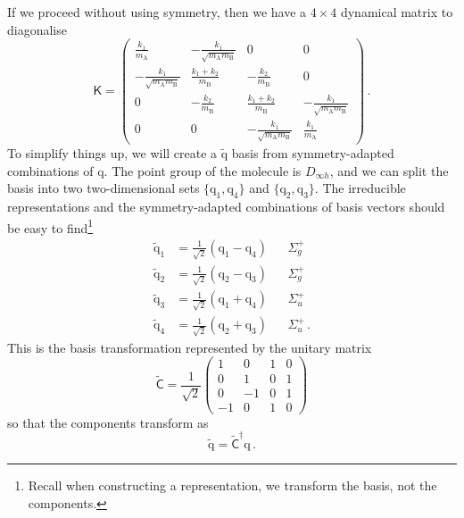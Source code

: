 \documentclass{article}
\theoremstyle{plain}\theoremheaderfont{\normalfont\itshape}\theorembodyfont{\rmfamily}\theoremseparator{.}\newtheorem*{rem}{Remark}\newtheorem*{ex}{Example}\newtheorem*{proof}{Proof}\newtheorem*{altp}{Alternative proof}
\theoremstyle{plain}\theoremheaderfont{\normalfont\bfseries}\theorembodyfont{\rmfamily}\theoremseparator{.}\newtheorem{thm}{Theorem}[section]\newtheorem{lem}[thm]{Lemma}\newtheorem{prop}[thm]{Proposition}\newtheorem*{cor}{Corollary}\newtheorem{defn}[thm]{Definition}\newtheorem{clm}[thm]{Claim}\newtheorem{clminproof}{Claim}
\theoremstyle{break}\theoremheaderfont{\normalfont\itshape}\theorembodyfont{\rmfamily}\theoremseparator{.\medskip}\newtheorem*{proofskip}{Proof}\newtheorem*{exs}{Examples}\newtheorem*{rems}{Remarks}
\theoremstyle{break}\theoremheaderfont{\normalfont\bfseries}\theorembodyfont{\rmfamily}\theoremseparator{.\medskip}\newtheorem{lemskip}[thm]{Lemma}\newtheorem{defnskip}[thm]{Definition}\newtheorem{propskip}[thm]{Proposition}\newtheorem{thmskip}[thm]{Theorem}
\numberwithin{equation}{section}
\newcommand{\vb}[1]{\bm{\mathrm{#1}}}
\renewcommand{\AA}{\mathrm{A}}
\newcommand{\BB}{\mathrm{B}}
\begin{document}
    If we proceed without using symmetry, then we have a \(4\times 4\) dynamical matrix to diagonalise
    \begin{equation}
        \mathsf{K}=\begin{pmatrix}
            \frac{k_1}{m_{\AA}} & -\frac{k_1}{\sqrt{m_{\AA}m_{\BB}}} & 0 & 0 \\
            -\frac{k_1}{\sqrt{m_{\AA}m_{\BB}}} & \frac{k_1+k_2}{m_{\BB}} & -\frac{k_2}{m_{\BB}} & 0 \\
            0 & -\frac{k_2}{m_{\BB}} & \frac{k_1+k_2}{m_{\BB}} & -\frac{k_1}{\sqrt{m_{\AA}m_{\BB}}} \\
            0 & 0 & -\frac{k_1}{\sqrt{m_{\AA}m_{\BB}}} & \frac{k_1}{m_{\AA}}
        \end{pmatrix}\,.
    \end{equation}
    To simplify things up, we will create a \(\tilde{\vb{q}}\) basis from symmetry-adapted combinations of \(\vb{q}\). The point group of the molecule is \(D_{\infty h}\), and we can split the basis into two two-dimensional sets \(\{\vb{q}_1,\vb{q}_4\}\) and \(\{\vb{q}_2,\vb{q}_3\}\). The irreducible representations and the symmetry-adapted combinations of basis vectors should be easy to find\footnote{Recall when constructing a representation, we transform the basis, not the components.}
    \begin{align}
        \tilde{\vb{q}}_1&=\frac{1}{\sqrt{2}}(\vb{q}_1-\vb{q}_4) & &\Sigma_g^+ \\
        \tilde{\vb{q}}_2&=\frac{1}{\sqrt{2}}(\vb{q}_2-\vb{q}_3) & &\Sigma_g^+ \\
        \tilde{\vb{q}}_3&=\frac{1}{\sqrt{2}}(\vb{q}_1+\vb{q}_4) & &\Sigma_u^+ \\
        \tilde{\vb{q}}_4&=\frac{1}{\sqrt{2}}(\vb{q}_2+\vb{q}_3) & &\Sigma_u^+ \,.
    \end{align}
    This is the basis transformation represented by the unitary matrix
    \begin{equation}
        \tilde{\mathsf{C}}=\frac{1}{\sqrt{2}}\begin{pmatrix}
            1 & 0 & 1 & 0 \\
            0 & 1 & 0 & 1 \\
            0 & -1 & 0 & 1 \\
            -1 & 0 & 1 & 0
        \end{pmatrix}
    \end{equation}
    so that the components transform as
    \begin{equation}
        \tilde{\vb{q}}=\tilde{\mathsf{C}}^\dagger\vb{q}\,.
    \end{equation}
\end{document}

